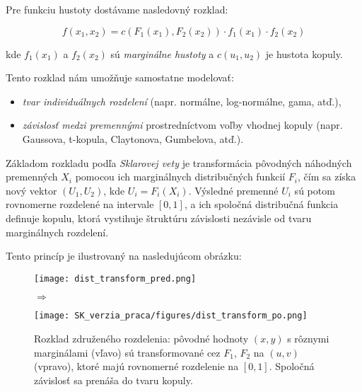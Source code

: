 Pre funkciu hustoty dostávame nasledovný rozklad:

\begin{equation}\label{eq:copula_density}
f(x_1, x_2) = c\left(F_1(x_1), F_2(x_2)\right) \cdot f_1(x_1) \cdot f_2(x_2)
\end{equation}

kde $f_1(x_1)$ a $f_2(x_2)$ sú \textit{marginálne hustoty} a $c(u_1, u_2)$ je hustota kopuly.

Tento rozklad nám umožňuje samostatne modelovať:
\begin{itemize}
  \item \textit{tvar individuálnych rozdelení} (napr. normálne, log-normálne, gama, atď.),
  \item \textit{závislosť medzi premennými} prostredníctvom voľby vhodnej kopuly (napr. Gaussova, t-kopula, Claytonova, Gumbelova, atď.).
\end{itemize}

Základom rozkladu podľa \textit{Sklarovej vety} je transformácia pôvodných náhodných premenných $X_i$ pomocou ich marginálnych distribučných funkcií $F_i$, čím sa získa nový vektor $(U_1, U_2)$, kde $U_i = F_i(X_i)$. Výsledné premenné $U_i$ sú potom rovnomerne rozdelené na intervale $[0,1]$, a ich spoločná distribučná funkcia definuje kopulu, ktorá vystihuje štruktúru závislosti nezávisle od tvaru marginálnych rozdelení.

Tento princíp je ilustrovaný na nasledujúcom obrázku:

\begin{figure}[H]
    \centering
    \begin{minipage}{0.45\linewidth}
        \centering
        \texttt{[image: dist\_transform\_pred.png]}
    \end{minipage}
    \begin{minipage}{0.05\linewidth}
        \centering
        \Huge$\Rightarrow$
    \end{minipage}
    \begin{minipage}{0.45\linewidth}
        \centering
        \texttt{[image: SK\_verzia\_praca/figures/dist\_transform\_po.png]}
    \end{minipage}
    \caption{Rozklad združeného rozdelenia: pôvodné hodnoty $(x, y)$ s rôznymi marginálami (vľavo) sú transformované cez $F_1$, $F_2$ na $(u,v)$ (vpravo), ktoré majú rovnomerné rozdelenie na $[0,1]$. Spoločná závislosť sa prenáša do tvaru kopuly.}
    \label{fig:sklar_transform}
\end{figure}

